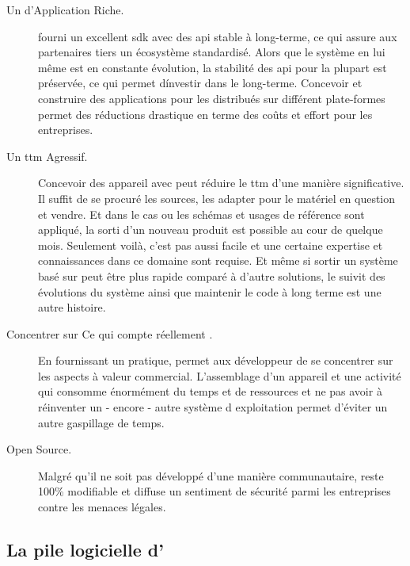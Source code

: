 \begin{description}

\item [Un  d'Application Riche.] \android{} fourni un
excellent \gls{sdk} avec des \gls{api} stable à long-terme, ce qui
assure aux partenaires tiers un écosystème standardisé. Alors que le
système en lui même est en constante évolution, la stabilité des
\gls{api} pour la plupart est préservée, ce qui permet d\'investir dans
le long-terme. Concevoir et construire des applications pour les
distribués sur différent plate-formes permet des réductions drastique en
terme des coûts et effort pour les entreprises.

\item [Un \gls{ttm} Agressif.] Concevoir des appareil avec \android{}
peut réduire le \gls{ttm} d'une manière significative. Il suffit de se
procuré les sources, les adapter pour le matériel en question et vendre. Et dans le cas ou les schémas et usages de référence sont
appliqué, la sorti d'un nouveau produit est possible au cour de quelque
mois. Seulement voilà, c'est pas aussi facile et une certaine expertise
et connaissances dans ce domaine sont requise. Et même si sortir un
système basé sur \android{} peut être plus rapide comparé à d'autre
solutions, le suivit des évolutions du système ainsi que maintenir le
code à long terme est une autre histoire.

\item [Concentrer sur \og Ce qui compte réellement \fg.] En fournissant
un  pratique, \android{} permet aux développeur de se
concentrer sur les aspects à valeur commercial. L'assemblage d'un
appareil et une activité qui consomme énormément du temps et de
ressources et ne pas avoir à réinventer un - encore - autre système d
exploitation permet d'éviter un autre gaspillage de temps.

\item [Open Source.] Malgré qu'il ne soit pas développé d'une manière
communautaire, \android{} reste 100\% modifiable et diffuse un sentiment
de sécurité parmi les entreprises contre les menaces légales.

\end{description}

\subsection[La pile logicielle d'\android{}]{La pile logicielle d'\android{}\cite{pa4ad:chptr1}}

